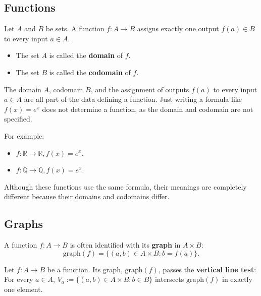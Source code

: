 \documentclass[11pt, draft]{article}
\begin{document}
\subsection{Functions}
\begin{definition}
    Let $A$ and $B$ be sets. A function $f: A \to B$ assigns exactly one output $f(a) \in B$ to every input $a \in A$.
\end{definition}
\begin{itemize}
    \item The set $A$ is called the \textbf{domain} of $f$.
    \item The set $B$ is called the \textbf{codomain} of $f$.
\end{itemize}

\begin{fact}The domain $A$, codomain $B$, and the assignment of outputs $f(a)$ to every input $a \in A$ are all part of the data defining a function. Just writing a formula like $f(x) = e^x$ does not determine a function, as the domain and codomain are not specified.
\end{fact}
For example:
\begin{itemize}
    \item $f: \mathbb{R} \to \mathbb{R}, f(x) = e^x$.
    \item $f: \mathbb{Q} \to \mathbb{Q}, f(x) = e^x$.
\end{itemize}
Although these functions use the same formula, their meanings are completely different because their domains and codomains differ.

\subsection{Graphs}
A function $f: A \to B$ is often identified with its \textbf{graph} in $A
    \times B$:
\[ \text{graph}(f) = \{(a, b) \in A \times B : b = f(a)\}. \]

\begin{lemma}
    Let $f: A \to B$ be a function. Its graph, $\text{graph}(f)$, passes the \textbf{vertical line test}: For every $a \in A$, $V_a := \{(a, b) \in A \times B : b \in B\}$ intersects $\text{graph}(f)$ in exactly one element.
\end{lemma}
\begin{center}
\end{center}
\end{document}
